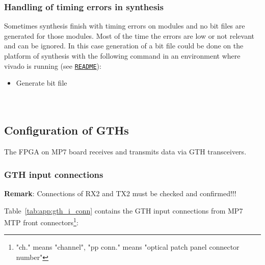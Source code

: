 \subsubsection{Handling of timing errors in synthesis}\label{sec:app:synth_timing_errors}

Sometimes synthesis finish with timing errors on modules and no bit files are generated for those modules.
Most of the time the errors are low or not relevant and can be ignored. In this case generation
of a bit file could be done on the platform of synthesis with the following command in an environment where
vivado is running (see \href{\gitbranch/README.md}{\texttt{README}}):\\
\begin{itemize}
\item Generate bit file\\
\\
\\
\end{itemize}

\subsection{Configuration of GTHs}\label{sec:app:app_a}

The FPGA on MP7 board receives and transmits data via GTH transceivers.\\

\subsubsection{GTH input connections}\label{sec:app:gth_i_conn}

\textbf{Remark}:
Connections of RX2 and TX2 must be checked and confirmed!!!

Table~\ref{tab:app:gth_i_conn} contains the GTH input connections from MP7 MTP front connectors\footnote{"ch." means "channel", "pp conn." means "optical patch panel connector number"}:

